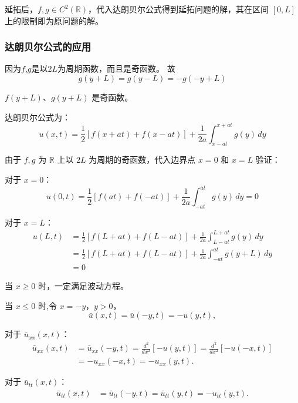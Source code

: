 \documentclass[12pt,a4paper]{article}
\numberwithin{subsection}{section}   %
\numberwithin{subsubsection}{subsection}
\theoremstyle{plain}
\theoremstyle{definition}
\theoremstyle{remark}
\theoremstyle{remark}
\begin{document}
延拓后，\(f, g \in C^2(\mathbb{R})\)，代入达朗贝尔公式得到延拓问题的解，其在区间 \([0, L]\) 上的限制即为原问题的解。

\subsubsection{达朗贝尔公式的应用}
因为$f$,$g$是以$2L$为周期函数，而且是奇函数。
故
\begin{equation}
g(y + L) = g(y - L) = -g(-y + L)
\end{equation}

$f(y + L)$、$g(y + L)$ 是奇函数。



达朗贝尔公式为：
\begin{equation}
	u(x,t) = \frac{1}{2} \left[ f(x + at) + f(x - at) \right] + \frac{1}{2a} \int_{x - at}^{x + at} g(y) \, dy
\end{equation}

由于 \(f, g\) 为 \(\mathbb{R}\) 上以 \(2L\) 为周期的奇函数，代入边界点 \(x = 0\) 和 \(x = L\) 验证：

对于 \(x = 0\)：
\begin{equation}
	u(0, t) = \frac{1}{2} \left[ f(at) + f(-at) \right] + \frac{1}{2a} \int_{-at}^{at} g(y) \, dy = 0
\end{equation}

对于 \(x = L\)：
\begin{equation}
	\begin{aligned}
		u(L, t) &= \frac{1}{2}[f(L + at) + f(L - at)] + \frac{1}{2a} \int_{L - at}^{L + at} g(y) \, dy \\
		&= \frac{1}{2}[f(L + at) + f(L - at)] + \frac{1}{2a} \int_{-at}^{at} g(y + L) \, dy \\
		&= 0
	\end{aligned}
\end{equation}

	当 \(x \geq 0\) 时，一定满足波动方程。

当 \(x \leq 0\) 时,令 \(x = -y\)，\(y > 0\)，
\[
\bar{u}(x, t) = \bar{u}(-y, t) = -u(y, t),
\]

对于 \(\bar{u}_{xx}(x, t)\)：
\[
\begin{aligned}
	\bar{u}_{xx}(x, t) &= \bar{u}_{xx}(-y, t) = \frac{d^2}{dx^2} [-u(y, t)] = \frac{d^2}{dx^2} [-u(-x, t)] \\
	&= -u_{xx}(-x, t) = -u_{xx}(y, t).
\end{aligned}
\]

对于 \(\bar{u}_{tt}(x, t)\)：
\[
\begin{aligned}
	\bar{u}_{tt}(x, t) &= \bar{u}_{tt}(-y, t) = \bar{u}_{tt}(y, t) = -u_{tt}(y, t).
\end{aligned}
\]
\end{document}
